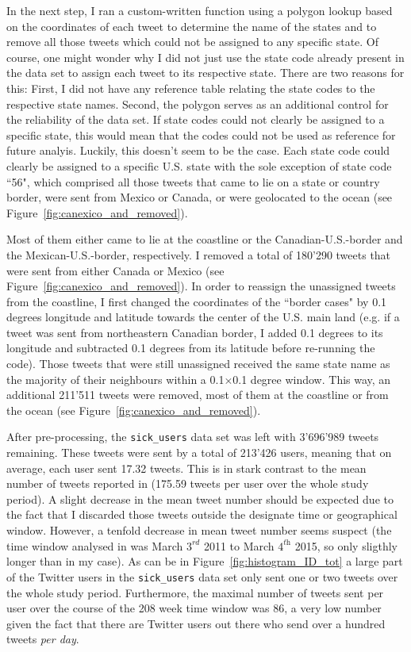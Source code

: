 \documentclass[11pt, a4paper,twoside]{report}\usepackage[]{graphicx}\usepackage[]{color}
\begin{document}
In the next step, I ran a custom-written function using a polygon lookup based on the coordinates of each tweet to determine the name of the states and to remove all those tweets which could not be assigned to any specific state. Of course, one might wonder why I did not just use the state code already present in the data set to assign each tweet to its respective state. There are two reasons for this: First, I did not have any reference table relating the state codes to the respective state names. Second, the polygon serves as an additional control for the reliability of the data set. If state codes could not clearly be assigned to a specific state, this would mean that the codes could not be used as reference for future analyis. Luckily, this doesn't seem to be the case. Each state code could clearly be assigned to a specific U.S. state with the sole exception of state code ``56", which comprised all those tweets that came to lie on a state or country border, were sent from Mexico or Canada, or were geolocated to the ocean (see Figure~\ref{fig:canexico_and_removed}).

Most of them either came to lie at the coastline or the Canadian-U.S.-border and the Mexican-U.S.-border, respectively. I removed a total of 180'290 tweets that were sent from either Canada or Mexico (see Figure~\ref{fig:canexico_and_removed}). In order to reassign the unassigned tweets from the coastline, I first changed the coordinates of the ``border cases" by 0.1 degrees longitude and latitude towards the center of the U.S. main land (e.g. if a tweet was sent from northeastern Canadian border, I added 0.1 degrees to its longitude and subtracted 0.1 degrees from its latitude before re-running the code). Those tweets that were still unassigned received the same state name as the majority of their neighbours within a 0.1$\times$0.1 degree window. This way, an additional 211'511 tweets were removed, most of them at the coastline or from the ocean (see Figure~\ref{fig:canexico_and_removed}).

After pre-processing, the \texttt{sick\_users} data set was left with 3'696'989 tweets remaining. These tweets were sent by a total of 213'426 users, meaning that on average, each user sent 17.32 tweets. This is in stark contrast to the mean number of tweets reported in \cite{bodnar_data_2015} (175.59 tweets per user over the whole study period). A slight decrease in the mean tweet number should be expected due to the fact that I discarded those tweets outside the designate time or geographical window. However, a tenfold decrease in mean tweet number seems suspect (the time window analysed in \cite{bodnar_data_2015} was March $3^\textit{rd}$ 2011 to March $4^\textit{th}$ 2015, so only sligthly longer than in my case). As can be in Figure~\ref{fig:histogram_ID_tot} a large part of the Twitter users in the \texttt{sick\_users} data set only sent one or two tweets over the whole study period. Furthermore, the maximal number of tweets sent per user over the course of the 208 week time window was 86, a very low number given the fact that there are Twitter users out there who send over a hundred tweets \textit{per day}.\newpage
\end{document}
